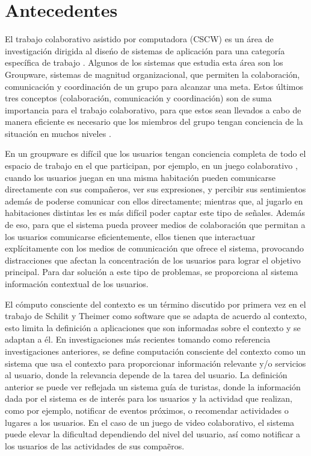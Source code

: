 \section{Antecedentes}
El trabajo colaborativo asistido por computadora (CSCW) es un \'area de investigaci\'on dirigida al dise\'no de sistemas de aplicaci\'on para una categor\'ia espec\'ifica de trabajo
\cite{schmidt1992taking}. Algunos de los sistemas que estudia esta \'area son los Groupware, sistemas de magnitud organizacional, que permiten la colaboraci\'on, comunicaci\'on y coordinaci\'on de un grupo para alcanzar una meta. Estos \'ultimos tres conceptos (colaboraci\'on, comunicaci\'on y coordinaci\'on) son de suma importancia para el trabajo colaborativo, para que estos sean llevados a cabo de manera eficiente es necesario que los miembros del grupo tengan conciencia de la situaci\'on en muchos niveles \cite{gutwin1996supporting}. 

En un groupware es dif\'icil que los usuarios tengan conciencia completa de todo el espacio de trabajo en el que participan, por ejemplo, en un juego colaborativo \cite{montane2013context}, cuando los usuarios juegan en una misma habitaci\'on pueden comunicarse directamente con sus compa\~neros, ver sus expresiones, y percibir sus sentimientos adem\'as de poderse comunicar con ellos directamente; mientras que, al jugarlo en habitaciones distintas les es m\'as dif\'icil poder captar este tipo de se\~nales. Adem\'as de eso, para que el sistema pueda proveer medios de colaboraci\'on que permitan a los usuarios comunicarse eficientemente, ellos tienen que interactuar expl\'icitamente con los medios de comunicaci\'on que ofrece el sistema, provocando distracciones que afectan la concentraci\'on de los usuarios para lograr el objetivo principal. Para dar soluci\'on a este tipo de problemas, se proporciona al sistema informaci\'on contextual de los usuarios.
 
El c\'omputo consciente del contexto es un t\'ermino discutido por primera vez en el trabajo de Schilit y Theimer como software que se adapta de acuerdo al contexto, esto limita la definici\'on a aplicaciones que son informadas sobre el contexto y se adaptan a \'el\cite{schillit1994disseminating}. En investigaciones m\'as recientes tomando como referencia investigaciones anteriores, se define computaci\'on consciente del contexto como un sistema que usa el contexto para proporcionar informaci\'on relevante y/o servicios al usuario, donde la relevancia depende de la tarea del usuario\cite{dey2001conceptual}. La definici\'on anterior se puede ver reflejada un sistema gu\'ia de turistas, donde la informaci\'on dada por el sistema es de inter\'es para los usuarios y la actividad que realizan, como por ejemplo, notificar de eventos pr\'oximos, o recomendar actividades o lugares a los usuarios. En el caso de un juego de video colaborativo, el sistema puede elevar la dificultad dependiendo del nivel del usuario, as\'i como notificar a los usuarios de las actividades de sus compa\~eros.

